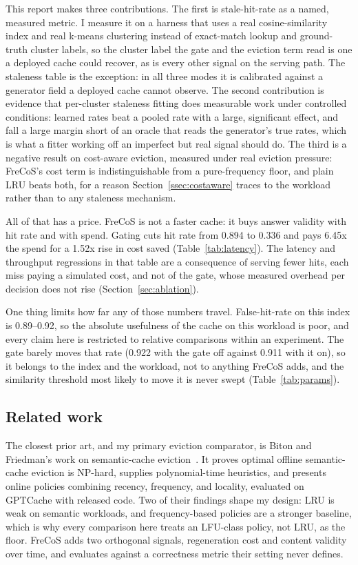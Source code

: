 \documentclass[10pt]{article}
\begin{document}
This report makes three contributions. The first is stale-hit-rate as a named, measured
metric. I measure it on a harness that uses a real cosine-similarity index and real k-means
clustering instead of exact-match lookup and ground-truth cluster labels, so the cluster
label the gate and the eviction term read is one a deployed cache could recover, as is every
other signal on the serving path. The staleness table is the exception: in all three modes it
is calibrated against a generator field a deployed cache cannot observe. The second
contribution is evidence that per-cluster staleness fitting does measurable work under
controlled conditions: learned
rates beat a pooled rate with a large, significant effect, and fall a large margin short of
an oracle that reads the generator's true rates, which is what a fitter working off an
imperfect but real signal should do. The third is a negative result on cost-aware eviction,
measured under real eviction pressure: FreCoS's cost term is indistinguishable from a
pure-frequency floor, and plain LRU beats both, for a reason Section~\ref{ssec:costaware}
traces to the workload rather than to any staleness mechanism.

All of that has a price. FreCoS is not a faster cache: it buys answer validity with hit rate
and with spend. Gating cuts hit rate from 0.894 to 0.336 and pays 6.45x the spend for a 1.52x
rise in cost saved (Table~\ref{tab:latency}). The latency and throughput regressions in that
table are a consequence of serving fewer hits, each miss paying a simulated cost, and not of
the gate, whose measured overhead per decision does not rise (Section~\ref{sec:ablation}).

One thing limits how far any of those numbers travel. False-hit-rate on this index is
0.89--0.92, so the absolute usefulness of the cache on this workload is poor, and every claim
here is restricted to relative comparisons within an experiment. The gate barely moves that
rate (0.922 with the gate off against 0.911 with it on), so it belongs to the index and the
workload, not to anything FreCoS adds, and the similarity threshold most likely to move
it is never swept (Table~\ref{tab:params}).

\subsection{Related work}

The closest prior art, and my primary eviction comparator, is Biton and Friedman's work
on semantic-cache eviction~\cite{bitonfriedman2026}. It proves optimal offline
semantic-cache eviction is NP-hard, supplies polynomial-time heuristics, and presents
online policies combining recency, frequency, and locality, evaluated on GPTCache with
released code. Two of their findings shape my design:
LRU is weak on semantic workloads, and frequency-based policies are a stronger baseline,
which is why every comparison here treats an LFU-class policy, not LRU, as the floor. FreCoS
adds two orthogonal signals, regeneration cost and content validity over time, and evaluates
against a correctness metric their setting never defines.
\end{document}
